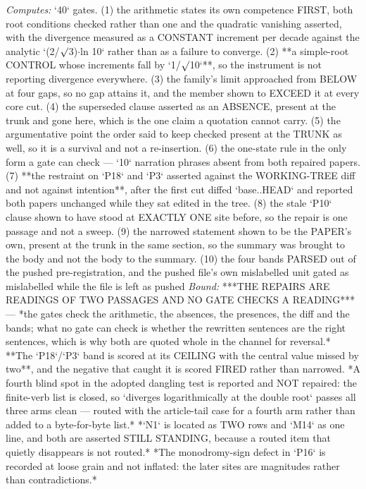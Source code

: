 \begin{description}
\emph{Computes:} `40` gates. (1) the arithmetic states its own competence FIRST, both root conditions checked rather than one and the quadratic vanishing asserted, with the divergence measured as a CONSTANT increment per decade against the analytic `(2/\ensuremath{\surd}3)\ensuremath{\cdot}ln 10` rather than as a failure to converge. (2) **a simple-root CONTROL whose increments fall by `1/\ensuremath{\surd}10`**, so the instrument is not reporting divergence everywhere. (3) the family's limit approached from BELOW at four gaps, so no gap attains it, and the member shown to EXCEED it at every core cut. (4) the superseded clause asserted as an ABSENCE, present at the trunk and gone here, which is the one claim a quotation cannot carry. (5) the argumentative point the order said to keep checked present at the TRUNK as well, so it is a survival and not a re-insertion. (6) the one-state rule in the only form a gate can check --- `10` narration phrases absent from both repaired papers. (7) **the restraint on `P18` and `P3` asserted against the WORKING-TREE diff and not against intention**, after the first cut diffed `base..HEAD` and reported both papers unchanged while they sat edited in the tree. (8) the stale `P10` clause shown to have stood at EXACTLY ONE site before, so the repair is one passage and not a sweep. (9) the narrowed statement shown to be the PAPER's own, present at the trunk in the same section, so the summary was brought to the body and not the body to the summary. (10) the four bands PARSED out of the pushed pre-registration, and the pushed file's own mislabelled unit gated as mislabelled while the file is left as pushed
 \emph{Bound:}  ***THE REPAIRS ARE READINGS OF TWO PASSAGES AND NO GATE CHECKS A READING*** --- *the gates check the arithmetic, the absences, the presences, the diff and the bands; what no gate can check is whether the rewritten sentences are the right sentences, which is why both are quoted whole in the channel for reversal.*  **The `P18`/`P3` band is scored at its CEILING with the central value missed by two**, and the negative that caught it is scored FIRED rather than narrowed.  *A fourth blind spot in the adopted dangling test is reported and NOT repaired: the finite-verb list is closed, so `diverges logarithmically at the double root` passes all three arms clean --- routed with the article-tail case for a fourth arm rather than added to a byte-for-byte list.*  *`N1` is located as TWO rows and `M14` as one line, and both are asserted STILL STANDING, because a routed item that quietly disappears is not routed.*  *The monodromy-sign defect in `P16` is recorded at loose grain and not inflated: the later sites are magnitudes rather than contradictions.*

\end{description}
